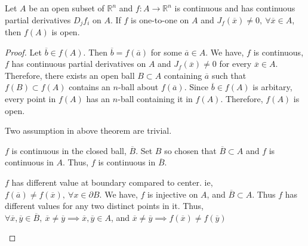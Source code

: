 \begin{theorem}
	Let $A$ be an open subset of $\mathbb{R}^n$ and $f : A \to \mathbb{R}^n$ is continuous and has continuous partial derivatives $D_jf_i$ on $A$. If $f$ is one-to-one on $A$ and $J_f(\overline{x}) \ne 0,\ \forall \overline{x} \in A$, then $f(A)$ is open.
\end{theorem}
\begin{proof}
	Let $\overline{b} \in f(A)$. Then $\overline{b} = f(\overline{a})$ for some $\overline{a} \in A$.
	We have, $f$ is continuous, $f$ has continuous partial derivatives on $A$ and $J_f(\overline{x}) \ne 0$ for every $\overline{x} \in A$.
	Therefore, there exists an open ball $B \subset A$ containing $\overline{a}$ such that $f(B) \subset f(A)$ contains an $n$-ball about $f(\overline{a})$.
	Since $\overline{b} \in f(A)$ is arbitary, every point in $f(A)$ has an $n$-ball containing it in $f(A)$.
	Therefore, $f(A)$ is open.\\

\begin{commentary} Two assumption in above theorem are trivial. \begin{enumerate*} \item $f$ is continuous in the closed ball, $\overline{B}$. Set $B$ so chosen that $\overline{B} \subset A$ and $f$ is continuous in $A$. Thus, $f$ is continuous in $\overline{B}$. \item $f$ has different value at boundary compared to center. ie, $f(\overline{a}) \ne f(\overline{x}),\ \forall x \in \partial B$. We have, $f$ is injective on $A$, and $\overline{B} \subset A$. Thus $f$ has different values for any two distinct points in it. Thus, $\forall \overline{x},\overline{y} \in \overline{B},\  \overline{x} \ne \overline{y} \implies \overline{x}, \overline{y} \in A$, and $\overline{x} \ne \overline{y} \implies f(\overline{x}) \ne f(\overline{y})$ \end{enumerate*}\end{commentary}
\end{proof}

